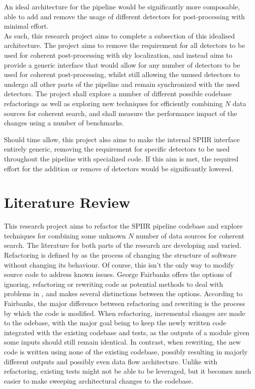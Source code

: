\documentclass{article}
\begin{document}
An ideal architecture for the pipeline would be significantly more composable, able to add and
remove the usage of different detectors for post-processing with minimal effort.
\\

As such, this research project aims to complete a subsection of this idealised architecture. The
project aims to remove the requirement for all detectors to be used for coherent post-processing
with sky localization, and instead aims to provide a generic interface that would allow for any
number of detectors to be used for coherent post-processing, whilst still allowing the unused
detectors to undergo all other parts of the pipeline and remain synchronized with the used
detectors. The project shall explore a number of different possible codebase refactorings as well as
exploring new techniques for efficiently combining \(N\) data sources for coherent search, and shall
measure the performance impact of the changes using a number of benchmarks.

Should time allow, this project also aims to make the internal SPIIR interface entirely generic,
removing the requirement for specific detectors to be used throughout the pipeline with specialized
code. If this aim is met, the required effort for the addition or remove of detectors would be
significantly lowered.

\section{Literature Review}

This research project aims to refactor the SPIIR pipeline codebase and explore techniques for
combining some unknown \(N\) number of data sources for coherent search. The literature for both
parts of the research are developing and varied.
\\

Refactoring is defined by \cite{Murphy} as the process of changing the structure of software without
changing its behaviour. Of course, this isn't the only way to modify source code to address known
issues. George Fairbanks offers the options of ignoring, refactoring or rewriting code as potential
methods to deal with problems in \cite{Fairbanks}, and makes several distinctions between the
options. According to Fairbanks, the major difference between refactoring and rewriting is the
process by which the code is modified. When refactoring, incremental changes are made to the
odebase, with the major goal being to keep the newly written code integrated with the existing
codebase and tests, as the outputs of a module given some inputs should still remain identical. In
contrast, when rewriting, the new code is written using none of the existing codebase, possibly
resulting in majorly different outputs and possibly even data flow architecture. Unlike with
refactoring, existing tests might not be able to be leveraged, but it becomes much easier to make
sweeping architectural changes to the codebase.
\end{document}
